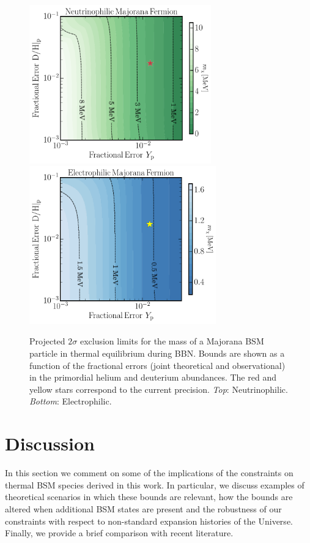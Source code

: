 \begin{figure}[t]
    \centering
    \includegraphics[width=0.7\textwidth]{figures/Nu_Maj_Errors_Levels.pdf} \\
    \quad \includegraphics[width=0.72\textwidth]{figures/EE_Maj_Errors_Levels.pdf} 
    \caption{Projected $2\sigma$ exclusion limits for the mass of a Majorana BSM particle in thermal equilibrium during BBN. Bounds are shown as a function of the fractional errors (joint theoretical and observational) in the primordial helium and deuterium abundances. The red and yellow stars correspond to the current precision. \emph{Top}: Neutrinophilic. \emph{Bottom}: Electrophilic.}
    \label{fig:futureBBN}
\end{figure}
\clearpage


\section{Discussion}\label{sec:discussion}
In this section we comment on some of the implications of the constraints on thermal BSM species derived in this work. In particular, we discuss examples of theoretical scenarios in which these bounds are relevant, how the bounds are altered when additional BSM states are present and the robustness of our constraints with respect to non-standard expansion histories of the Universe. Finally, we provide a brief comparison with recent literature. 
